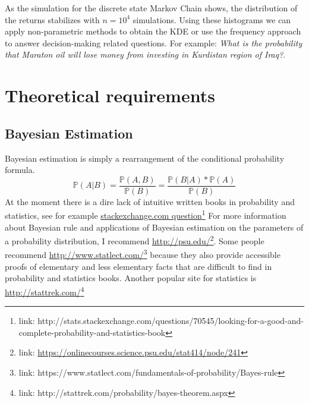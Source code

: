 \documentclass[a4paper,12pt]{article}
\theoremstyle{definition}
\begin{document}
As the simulation for the discrete state Markov Chain shows, the distribution of the returns stabilizes with $n=10^4$ simulations. Using these histograms we can apply non-parametric methods to obtain the KDE or use the frequency approach to answer decision-making related questions. For example: \textit{What is the probability that Maraton oil will lose money from investing in Kurdistan region of Iraq?}.

\section{Theoretical requirements}
\subsection{Bayesian Estimation}
Bayesian estimation is simply a rearrangement of the conditional probability formula.
\begin{equation}
\mathbb{P}(A|B) = \frac{\mathbb{P}(A,B)}{\mathbb{P}(B)} = \frac{\mathbb{P}(B|A)*\mathbb{P}(A)}{\mathbb{P}(B)}
\end{equation}
At the moment there is a dire lack of intuitive written books in probability and statistics, see for example \href{http://stats.stackexchange.com/questions/70545/looking-for-a-good-and-complete-probability-and-statistics-book}{stackexchange.com question}\footnote{link: http://stats.stackexchange.com/questions/70545/looking-for-a-good-and-complete-probability-and-statistics-book}
For more information about Bayesian rule and applications of Bayesian estimation on the parameters of a probability distribution, I recommend  \href{https://onlinecourses.science.psu.edu/stat414/node/241}{http://psu.edu/}\footnote{link: \href{https://onlinecourses.science.psu.edu/stat414/node/241}{https://onlinecourses.science.psu.edu/stat414/node/241}}. Some people recommend \href{https://www.statlect.com/fundamentals-of-probability/Bayes-rule}{http://www.statlect.com/}\footnote{link: https://www.statlect.com/fundamentals-of-probability/Bayes-rule} because they also provide accessible proofs of elementary and less elementary facts that are difficult to find in probability and statistics books. Another popular site for statistics is \href{http://stattrek.com/probability/bayes-theorem.aspx}{http://stattrek.com/}\footnote{link: http://stattrek.com/probability/bayes-theorem.aspx}
\end{document}
